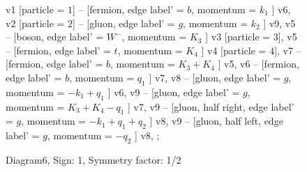 \documentclass{revtex4}
\begin{document}
\begin{figure}[!htb]
\begin{center}
{    %
v1 [particle = \(1\)] -- [fermion, edge label' = \(b\), momentum = \(k_{1}\) ] v6, 
v2 [particle = \(2\)] -- [gluon, edge label' = \(g\), momentum = \(k_{2}\) ] v9, 
v5 -- [boson, edge label' = \(W^{-}\), momentum = \(K_{3}\) ] v3 [particle = \(3\)], 
v5 -- [fermion, edge label' = \(t\), momentum = \(K_{4}\) ] v4 [particle = \(4\)], 
v7 -- [fermion, edge label' = \(b\), momentum = \(K_{3} + K_{4}\) ] v5, 
v6 -- [fermion, edge label' = \(b\), momentum = \(q_{1}\) ] v7, 
v8 -- [gluon, edge label' = \(g\), momentum = \(-k_{1} + q_{1}\) ] v6, 
v9 -- [gluon, edge label' = \(g\), momentum = \(K_{3} + K_{4} - q_{1}\) ] v7, 
v9 -- [gluon, half right, edge label' = \(g\), momentum = \(-k_{1} + q_{1} + q_{2}\) ] v8, 
v9 -- [gluon, half left, edge label' = \(g\), momentum = \(-q_{2}\) ] v8, 
};
\end{center}
\caption{Diagram6, Sign: 1, Symmetry factor: 1/2}
\end{figure}
\newpage
\end{document}

